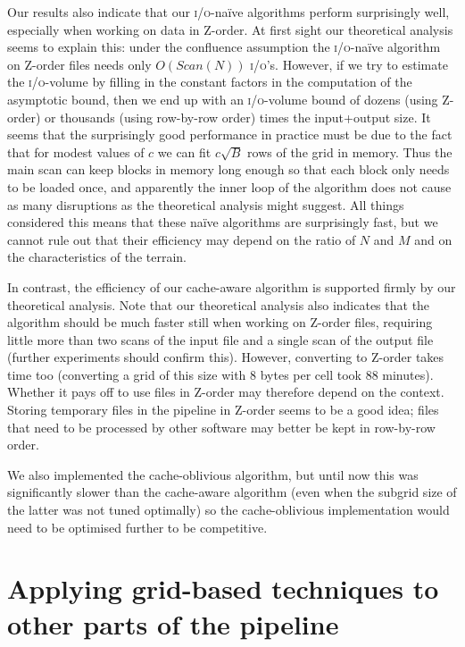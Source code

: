 \documentclass[10pt,a4paper]{article}
\def\io{\textsc{i/o}\xspace}
\def\ios{\textsc{i/o}'s\xspace}
\def\scan{\mathit{Scan}}
\begin{document}
Our results also indicate that our \io-na\"ive algorithms perform surprisingly well, especially when working on data in Z-order. At first sight our theoretical analysis seems to explain this: under the confluence assumption the \io-na\"ive algorithm on Z-order files needs only $O(\scan(N))$ \ios. However, if we try to estimate the \io-volume by filling in the constant factors in the computation of the asymptotic bound, then we end up with an \io-volume bound of dozens (using Z-order) or thousands (using row-by-row order) times the input+output size. It seems that the surprisingly good performance in practice must be due to the fact that for modest values of $c$ we can fit $c \sqrt B$ rows of the grid in memory. Thus the main scan can keep blocks in memory long enough so that each block only needs to be loaded once, and apparently the inner loop of the algorithm does not cause as many disruptions as the theoretical analysis might suggest. All things considered this means that these na\"ive algorithms are surprisingly fast, but we cannot rule out that their efficiency may depend on the ratio of $N$ and $M$ and on the characteristics of the terrain.

In contrast, the efficiency of our cache-aware algorithm is supported firmly by our theoretical analysis. Note that our theoretical analysis also indicates that the algorithm should be much faster still when working on Z-order files, requiring little more than two scans of the input file and a single scan of the output file (further experiments should confirm this). However, converting to Z-order takes time too (converting a grid of this size with 8 bytes per cell took 88 minutes). Whether it pays off to use files in Z-order may therefore depend on the context. Storing temporary files in the pipeline in Z-order seems to be a good idea; files that need to be processed by other software may better be kept in row-by-row order.

We also implemented the cache-oblivious algorithm, but until now this was significantly slower than the cache-aware algorithm (even when the subgrid size of the latter was not tuned optimally) so the cache-oblivious implementation would need to be optimised further to be competitive.

\section{Applying grid-based techniques to other parts of the pipeline}
\label{sec:otherstages}
\end{document}
